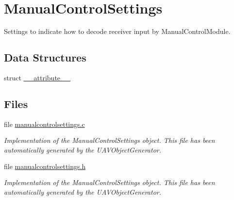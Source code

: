 \hypertarget{group___manual_control_settings}{\section{\-Manual\-Control\-Settings}
\label{group___manual_control_settings}
}


\-Settings to indicate how to decode receiver input by \-Manual\-Control\-Module.  


\subsection*{\-Data \-Structures}
\begin{DoxyCompactItemize}
\item 
struct \hyperlink{struct____attribute____}{\-\_\-\-\_\-attribute\-\_\-\-\_\-}
\end{DoxyCompactItemize}
\subsection*{\-Files}
\begin{DoxyCompactItemize}
\item 
file \hyperlink{manualcontrolsettings_8c}{manualcontrolsettings.\-c}
\begin{DoxyCompactList}\small\item\em \-Implementation of the \-Manual\-Control\-Settings object. \-This file has been automatically generated by the \-U\-A\-V\-Object\-Generator. \end{DoxyCompactList}\item 
file \hyperlink{manualcontrolsettings_8h}{manualcontrolsettings.\-h}
\begin{DoxyCompactList}\small\item\em \-Implementation of the \-Manual\-Control\-Settings object. \-This file has been automatically generated by the \-U\-A\-V\-Object\-Generator. \end{DoxyCompactList}\end{DoxyCompactItemize}
